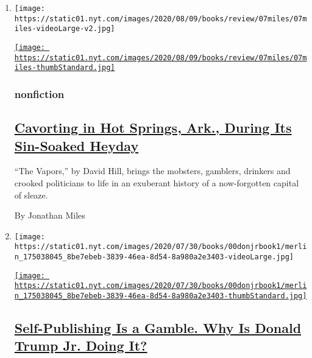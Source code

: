 \begin{enumerate}
\def\labelenumi{\arabic{enumi}.}
\item
  \texttt{[image: https://static01.nyt.com/images/2020/08/09/books/review/07miles/07miles-videoLarge-v2.jpg]}

  \href{/2020/07/07/books/review/the-vapors-david-hill.html}{\texttt{[image: https://static01.nyt.com/images/2020/08/09/books/review/07miles/07miles-thumbStandard.jpg]}}

  \hypertarget{nonfiction}{%
  \subsubsection{nonfiction}\label{nonfiction}}

  \hypertarget{cavorting-in-hot-springs-ark-during-its-sin-soaked-heyday}{%
  \subsection{\texorpdfstring{\href{/2020/07/07/books/review/the-vapors-david-hill.html}{Cavorting
  in Hot Springs, Ark., During Its Sin-Soaked
  Heyday}}{Cavorting in Hot Springs, Ark., During Its Sin-Soaked Heyday}}\label{cavorting-in-hot-springs-ark-during-its-sin-soaked-heyday}}

  ``The Vapors,'' by David Hill, brings the mobsters, gamblers, drinkers
  and crooked politicians to life in an exuberant history of a
  now-forgotten capital of sleaze.

  By Jonathan Miles
\item
  \texttt{[image: https://static01.nyt.com/images/2020/07/30/books/00donjrbook1/merlin\_175038045\_8be7ebeb-3839-46ea-8d54-8a980a2e3403-videoLarge.jpg]}

  \href{/2020/08/06/books/donald-trump-jr-liberal-privilege.html}{\texttt{[image: https://static01.nyt.com/images/2020/07/30/books/00donjrbook1/merlin\_175038045\_8be7ebeb-3839-46ea-8d54-8a980a2e3403-thumbStandard.jpg]}}

  \hypertarget{self-publishing-is-a-gamble-why-is-donald-trump-jr-doing-it}{%
  \subsection{\texorpdfstring{\href{/2020/08/06/books/donald-trump-jr-liberal-privilege.html}{Self-Publishing
  Is a Gamble. Why Is Donald Trump Jr. Doing
  It?}}{Self-Publishing Is a Gamble. Why Is Donald Trump Jr. Doing It?}}\label{self-publishing-is-a-gamble-why-is-donald-trump-jr-doing-it}}


\end{enumerate}
